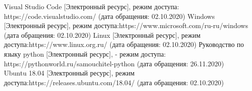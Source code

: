 \begin{thebibliography}{3}
	Visual Studio Code [Электронный ресурс], режим доступа: https://code.visualstudio.com/ (дата обращения: 02.10.2020)
	Windows [Электронный ресурс], режим доступа:https://www.microsoft.com/ru-ru/windows (дата обращения: 02.10.2020)
	Linux [Электронный ресурс], режим доступа:https://www.linux.org.ru/ (дата обращения: 02.10.2020)
	Руководство по языку python [Электронный ресурс], - режим доступа: https://pythonworld.ru/samouchitel-python (дата обращения: 26.11.2020)
	Ubuntu 18.04 [Электронный ресурс], режим доступа:https://releases.ubuntu.com/18.04/ (дата обращения: 02.10.2020)
\end{thebibliography}
